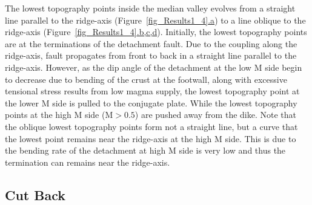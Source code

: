 The lowest topography points inside the median valley evolves from a straight line parallel to the ridge-axis (Figure~\hyperref[fig_Results1_4]{\ref{fig_Results1_4}.a}) to a line oblique to the ridge-axis (Figure~\hyperref[fig_Results1_4]{\ref{fig_Results1_4}.b,c,d}). Initially, the lowest topography points are at the terminations of the detachment fault. Due to the coupling along the ridge-axis, fault propagates from front to back in a straight line parallel to the ridge-axis. However, as the dip angle of the detachment at the low M side begin to decrease due to bending of the crust at the footwall, along with excessive tensional stress results from low magma supply, the lowest topography point at the lower M side is pulled to the conjugate plate. While the lowest topography points at the high M side (M$>0.5$) are pushed away from the dike. Note that the oblique lowest topography points form not a straight line, but a curve that the lowest point remains near the ridge-axis at the high M side. This is due to the bending rate of the detachment at high M side is very low and thus the termination can remains near the ridge-axis.      

\subsection{Cut Back}\label{Sec_CutBack}

